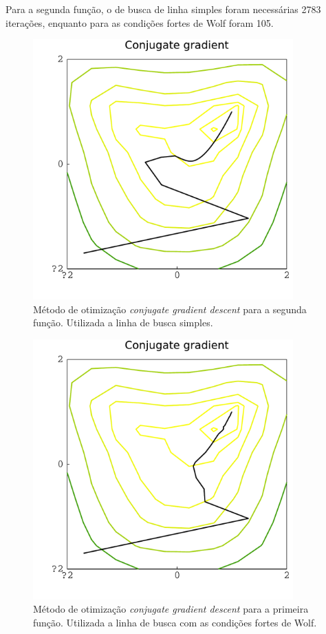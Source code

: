 \documentclass[12pt]{article}
\begin{document}
Para a segunda função, o de busca de linha simples foram necessárias 2783 iterações, enquanto para as condições fortes de Wolf foram 105.
\begin{figure}[ht!]
	\centering
	\includegraphics[width=10cm]{Figuras/Conjugate_gradient_linef1}
	\caption{Método de otimização \textit{conjugate gradient descent} para a segunda função. Utilizada a linha de busca simples.}
	\label{fig:conj1}
\end{figure} 
\begin{figure}[ht!]
	\centering
	\includegraphics[width=10cm]{Figuras/Conjugate_gradient_strongf1}
	\caption{Método de otimização \textit{conjugate gradient descent} para a primeira função. Utilizada a linha de busca com as condições fortes de Wolf.} 
	\label{fig:conj3}
\end{figure} 
\end{document}
